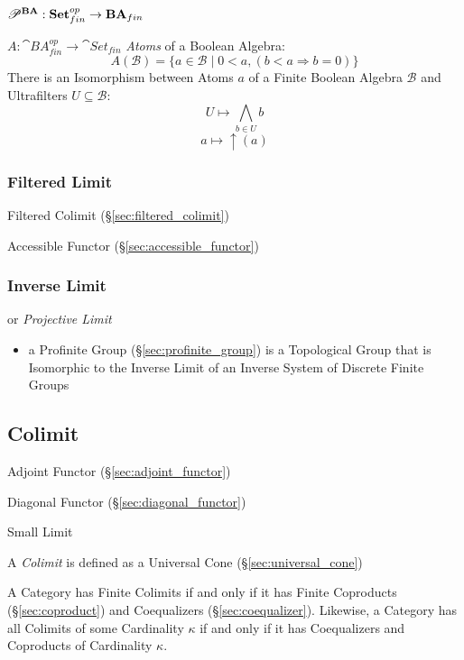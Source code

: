 $\mathscr{P}^\mathbf{BA} :
  \mathbf{Set}^{op}_{fin} \rightarrow \mathbf{BA}_{fin}$

$A : \cat{BA}^{op}_{fin} \rightarrow \cat{Set}_{fin}$
\emph{Atoms} of a Boolean Algebra:
\[
  A(\mathcal{B}) = \{ a \in \mathcal{B} \;|\;
    0 < a, (b < a \Rightarrow b = 0) \}
\]
There is an Isomorphism between Atoms $a$ of a Finite Boolean Algebra
$\mathcal{B}$ and Ultrafilters $U \subseteq \mathcal{B}$:
\[
  U \mapsto \bigwedge_{b \in U} b
\]\[
  a \mapsto \uparrow (a)
\]



\subsubsection{Filtered Limit}\label{sec:filtered_limit}

Filtered Colimit (\S\ref{sec:filtered_colimit})

Accessible Functor (\S\ref{sec:accessible_functor})



\subsubsection{Inverse Limit}\label{sec:inverse_limit}

or \emph{Projective Limit}

\begin{itemize}
  \item a Profinite Group (\S\ref{sec:profinite_group}) is a Topological Group
    that is Isomorphic to the Inverse Limit of an Inverse System of Discrete
    Finite Groups
\end{itemize}



\subsection{Colimit}\label{sec:colimit}

Adjoint Functor (\S\ref{sec:adjoint_functor})

Diagonal Functor (\S\ref{sec:diagonal_functor})

Small Limit

A \emph{Colimit} is defined as a Universal Cone
(\S\ref{sec:universal_cone})

A Category has Finite Colimits if and only if it has Finite Coproducts
(\S\ref{sec:coproduct}) and Coequalizers (\S\ref{sec:coequalizer}).
Likewise, a Category has all Colimits of some Cardinality $\kappa$ if
and only if it has Coequalizers and Coproducts of Cardinality
$\kappa$.

